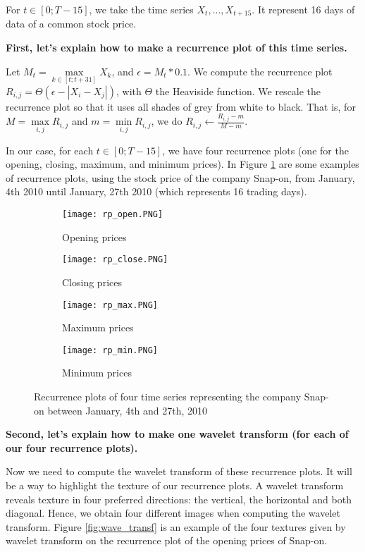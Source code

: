 \documentclass[11pt]{article}
\begin{document}
\begin{onehalfspace}
For $t \in [0; T-15]$, we take the time series $X_t, ..., X_{t+15}$. It represent 16 days of data of a common stock price.

\noindent \textbf{First, let's explain how to make a recurrence plot of this time series.}

Let $M_t = \max\limits_{k \in [t;t+31]} X_k$, and $\epsilon = M_t * 0.1$. We compute the recurrence plot $R_{i,j} = \Theta (\epsilon - |X_i - X_j|)$, with $\Theta$ the Heaviside function. We rescale the recurrence plot so that it uses all shades of grey from white to black. That is, for $M = \max\limits_{i,j} R_{i,j}$ and $m = \min\limits_{i,j} R_{i,j}$, we do $R_{i,j} \leftarrow \frac{R_{i,j} - m }{M - m }$. 

In our case, for each $t \in [0; T-15]$, we have four recurrence plots (one for the opening, closing, maximum, and minimum prices). In Figure \ref{fig:rec_plot} are some examples of recurrence plots, using the stock price of the company Snap-on, from January, 4th 2010 until January, 27th 2010 (which represents 16 trading days). 

\begin{figure}[h!]
    \centering
    \captionsetup{justification=centering}
    \begin{subfigure}{0.24\textwidth}
        \texttt{[image: rp\_open.PNG]}
        \caption{Opening prices}
    \end{subfigure}
    \begin{subfigure}{0.24\textwidth}
        \texttt{[image: rp\_close.PNG]}
        \caption{Closing prices}
    \end{subfigure}
    \begin{subfigure}{0.24\textwidth}
        \texttt{[image: rp\_max.PNG]}
        \caption{Maximum prices}
    \end{subfigure}    
    \begin{subfigure}{0.24\textwidth}
        \texttt{[image: rp\_min.PNG]}
        \caption{Minimum prices}
    \end{subfigure}
    \caption{Recurrence plots of four time series representing the company Snap-on between January, 4th and 27th, 2010}
    \label{fig:rec_plot}
\end{figure}

\noindent \textbf{Second, let's explain how to make one wavelet transform (for each of our four recurrence plots).}

Now we need to compute the wavelet transform of these recurrence plots. It will be a way to highlight the texture of our recurrence plots. A wavelet transform reveals texture in four preferred directions: the vertical, the horizontal and both diagonal. Hence, we obtain four different images when computing the wavelet transform. Figure \ref{fig:wave_transf} is an example of the four textures given by wavelet transform on the recurrence plot of the opening prices of Snap-on.


\end{onehalfspace}
\end{document}
